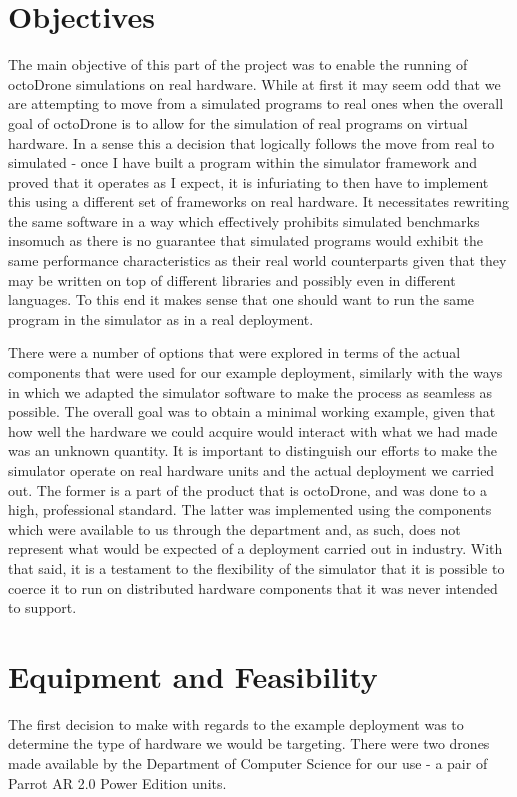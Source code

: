 \section{Objectives}
The main objective of this part of the project was to enable the running of octoDrone simulations on real hardware. While at first it may seem odd that we are attempting to move from a simulated programs to real ones when the overall goal of octoDrone is to allow for the simulation of real programs on virtual hardware. In a sense this a decision that logically follows the move from real to simulated - once I have built a program within the simulator framework and proved that it operates as I expect, it is infuriating to then have to implement this using a different set of frameworks on real hardware. It necessitates rewriting the same software in a way which effectively prohibits simulated benchmarks insomuch as there is no guarantee that simulated programs would exhibit the same performance characteristics as their real world counterparts given that they may be written on top of different libraries and possibly even in different languages. To this end it makes sense that one should want to run the same program in the simulator as in a real deployment.

There were a number of options that were explored in terms of the actual components that were used for our example deployment, similarly with the ways in which we adapted the simulator software to make the process as seamless as possible. The overall goal was to obtain a minimal working example, given that how well the hardware we could acquire would interact with what we had made was an unknown quantity. It is important to distinguish our efforts to make the simulator operate on real hardware units and the actual deployment we carried out. The former is a part of the product that is octoDrone, and was done to a high, professional standard. The latter was implemented using the components which were available to us through the department and, as such, does not represent what would be expected of a deployment carried out in industry. With that said, it is a testament to the flexibility of the simulator that it is possible to coerce it to run on distributed hardware components that it was never intended to support.

\section{Equipment and Feasibility}
The first decision to make with regards to the example deployment was to determine the type of hardware we would be targeting. There were two drones made available by the Department of Computer Science for our use - a pair of Parrot AR 2.0 Power Edition units.

